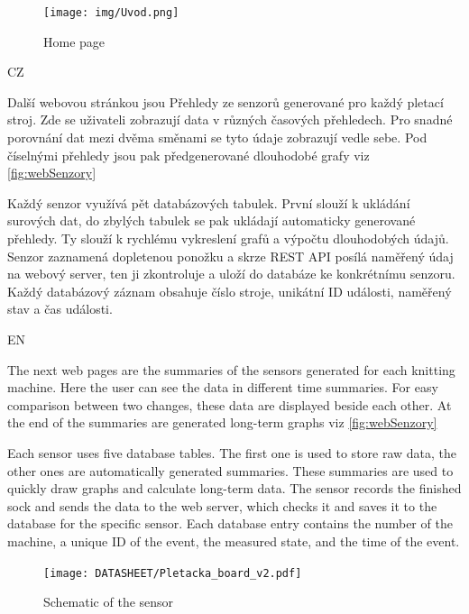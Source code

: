 \documentclass[12pt, a4paper]{article}
\begin{document}
\begin{figure}[t]
    \centering
    \texttt{[image: img/Uvod.png]}
    \caption{Home page}
    \label{fig:webUvod}
\end{figure}

CZ

Další webovou stránkou jsou Přehledy ze senzorů generované pro každý pletací stroj.
Zde se uživateli zobrazují data v různých časových přehledech.
Pro snadné porovnání dat mezi dvěma směnami se tyto údaje zobrazují vedle sebe.
Pod číselnými přehledy jsou pak předgenerované dlouhodobé grafy viz \ref{fig:webSenzory}

Každý senzor využívá pět databázových tabulek. První slouží k ukládání surových dat, do zbylých tabulek se pak ukládají automaticky generované přehledy.
Ty slouží k rychlému vykreslení grafů a výpočtu dlouhodobých údajů.
Senzor zaznamená dopletenou ponožku a skrze REST API posílá naměřený údaj na webový server, ten ji zkontroluje a uloží do databáze ke konkrétnímu senzoru.
Každý databázový záznam obsahuje číslo stroje, unikátní ID události, naměřený stav a čas události.

EN

The next web pages are the summaries of the sensors generated for each knitting machine.
Here the user can see the data in different time summaries.
For easy comparison between two changes, these data are displayed beside each other.
At the end of the summaries are generated long-term graphs viz \ref{fig:webSenzory}

Each sensor uses five database tables. The first one is used to store raw data, the other ones are automatically generated summaries.
These summaries are used to quickly draw graphs and calculate long-term data.
The sensor records the finished sock and sends the data to the web server, which checks it and saves it to the database for the specific sensor.
Each database entry contains the number of the machine, a unique ID of the event, the measured state, and the time of the event.

% 
\begin{figure}[htbp]
    \centering
    \texttt{[image: DATASHEET/Pletacka\_board\_v2.pdf]}
    \caption{Schematic of the sensor}
    \label{fig:Schemav1}
\end{figure}
\end{document}
